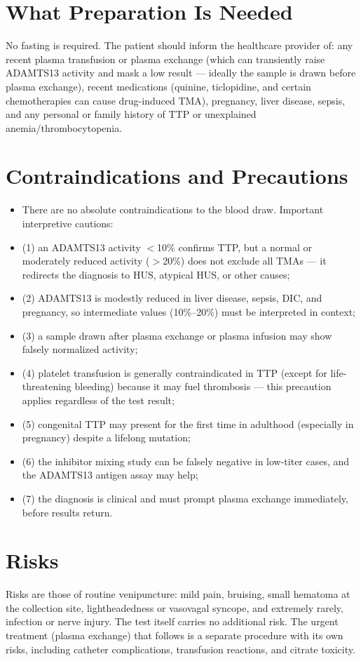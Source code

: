 \section*{What Preparation Is Needed}
No fasting is required. The patient should inform the healthcare provider of: any recent plasma transfusion or plasma exchange (which can transiently raise ADAMTS13 activity and mask a low result --- ideally the sample is drawn before plasma exchange), recent medications (quinine, ticlopidine, and certain chemotherapies can cause drug-induced TMA), pregnancy, liver disease, sepsis, and any personal or family history of TTP or unexplained anemia/thrombocytopenia.

\section*{Contraindications and Precautions}
\begin{itemize}
  \item There are no absolute contraindications to the blood draw. Important interpretive cautions:
  \item (1) an ADAMTS13 activity $<$10\% confirms TTP, but a normal or moderately reduced activity ($>$20\%) does not exclude all TMAs --- it redirects the diagnosis to HUS, atypical HUS, or other causes;
  \item (2) ADAMTS13 is modestly reduced in liver disease, sepsis, DIC, and pregnancy, so intermediate values (10\%--20\%) must be interpreted in context;
  \item (3) a sample drawn after plasma exchange or plasma infusion may show falsely normalized activity;
  \item (4) platelet transfusion is generally contraindicated in TTP (except for life-threatening bleeding) because it may fuel thrombosis --- this precaution applies regardless of the test result;
  \item (5) congenital TTP may present for the first time in adulthood (especially in pregnancy) despite a lifelong mutation;
  \item (6) the inhibitor mixing study can be falsely negative in low-titer cases, and the ADAMTS13 antigen assay may help;
  \item (7) the diagnosis is clinical and must prompt plasma exchange immediately, before results return.
\end{itemize}
\section*{Risks}
Risks are those of routine venipuncture: mild pain, bruising, small hematoma at the collection site, lightheadedness or vasovagal syncope, and extremely rarely, infection or nerve injury. The test itself carries no additional risk. The urgent treatment (plasma exchange) that follows is a separate procedure with its own risks, including catheter complications, transfusion reactions, and citrate toxicity.

